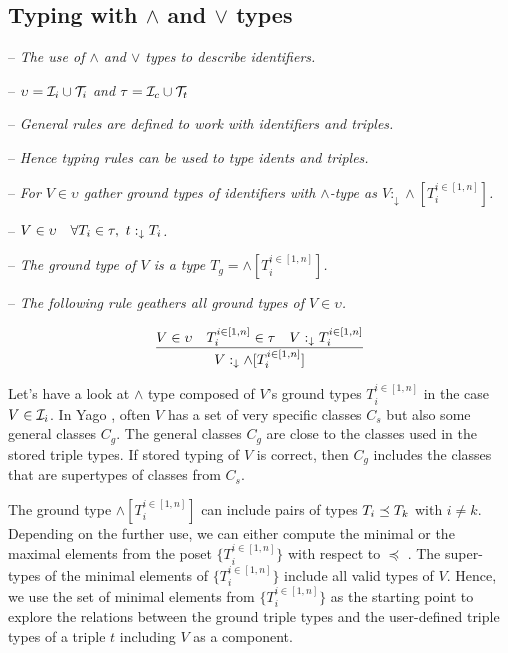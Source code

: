 \documentclass[runningheads]{llncs}
\newcommand{\darr}{\downarrow}
\newcommand{\I}{{\cal I}}
\newcommand{\T}{{\cal T}}
\newcommand{\memo}[1]{}
\newcommand{\notes}[1]{\noindent\begin{small}-- \emph{#1}\hfill\break\end{small}}
\newcommand{\nnotes}[1]{\indent\begin{small}-- \emph{#1}\hfill\break\end{small}}
\newcommand{\ennotes}[1]{\indent\begin{small}-- \emph{#1}\hfill\end{small}}
\begin{document}
\subsection{Typing with $\land$ and $\lor$ types}

\medskip
\notes{The use of $\land$ and $\lor$ types to describe identifiers.}
\nnotes{$\upsilon=\I_i\cup\T_i$ and $\tau=\I_c\cup\T_t$}
\nnotes{General rules are defined to work with identifiers and triples.}
\nnotes{Hence typing rules can be used to type idents and triples.}

\notes{For $V\in\upsilon$ gather ground types of identifiers with $\land$-type as $V:_{\darr}\land[T_i^{i\in[1,n]}]$.}
\nnotes{$V\in\upsilon\quad\forall\/T_i\in\tau,\ t:_{\darr}T_i$.}
\nnotes{The ground type of $V$ is a type $T_g=\land[T_i^{i\in[1,n]}]$.}
\ennotes{The following rule geathers all ground types of $V\in\upsilon$.}

\begin{equation}
\label{rul:land-1}
\dfrac{V\in\upsilon\quad\/T_i^{i\in[1,n]}\in\tau\quad\/V:_{\darr}T_i^{i\in[1,n]}}
      {V:_{\darr}\land[T_i^{i\in[1,n]}]}
\end{equation}

Let's have a look at $\land$ type composed of $V$'s ground types
$T_i^{i\in[1,n]}$ in the case $V\in\I_i$. In Yago \cite{Hoffart2013},
often $V$ has a set of very specific classes $C_s$ but also some
general classes $C_g$. The general classes $C_g$ are close to the
classes used in the stored triple types. If stored typing of $V$ is
correct, then $C_g$ includes the classes that are supertypes of
classes from $C_s$.

The ground type $\land[T_i^{i\in[1,n]}]$ can include pairs of types
$T_i\preceq\/T_k$ with $i\not=k$. Depending on the further use, we can
either compute the minimal or the maximal elements from the poset
$\{T_i^{i\in[1,n]}\}$ with respect to $\preceq$
\cite{DaveyPriestley2002}. The super-types of the minimal elements of
$\{T_i^{i\in[1,n]}\}$ include all valid types of $V$. Hence, we use
the set of minimal elements from $\{T_i^{i\in[1,n]}\}$ as the starting
point to explore the relations between the ground triple types and the
user-defined triple types of a triple $t$ including $V$ as a
component.

\memo{
the type $\land[T_i^{i\in[1,n]}]$ It makes sense
either to compute MIN or MAX of $\land[T_i^{i\in[1,n]}]$ yielding
$\land[S_1..S_m]$ where $m\le\/n$ and
$S_j^{j\in[1,m]}\in\{T_i^{i\in[1,n]}\}$. The operator MIN computes
$S_j^{j\in[1,m]}$ such that each $S_j$ is minimal among
$T_i^{i\in[1,n]}$. The operator MAX computes $S_j^{j\in[1,m]}$ such
that each $S_j$ is maximal among $T_i^{i\in[1,n]}$. Note that in both
cases there are no pairs among $S_j^{j\in[1,m]}$ related by $\preceq$.}
\end{document}
